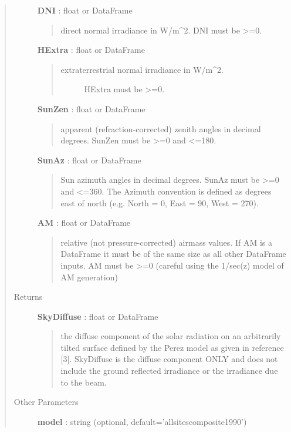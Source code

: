 \documentclass[letterpaper,10pt,english]{sphinxmanual}
\begin{document}
\begin{fulllineitems}
\begin{quote}
\begin{description}
\textbf{DNI} : float or DataFrame
\begin{quote}

direct normal irradiance in W/m\textasciicircum{}2. 
DNI must be \textgreater{}=0.
\end{quote}

\textbf{HExtra} : float or DataFrame
\begin{quote}
\begin{description}
\item[{extraterrestrial normal irradiance in W/m\textasciicircum{}2. }] \leavevmode
HExtra must be \textgreater{}=0.

\end{description}
\end{quote}

\textbf{SunZen} : float or DataFrame
\begin{quote}

apparent (refraction-corrected) zenith
angles in decimal degrees. 
SunZen must be \textgreater{}=0 and \textless{}=180.
\end{quote}

\textbf{SunAz} : float or DataFrame
\begin{quote}

Sun azimuth angles in decimal degrees.
SunAz must be \textgreater{}=0 and \textless{}=360. The Azimuth convention is defined
as degrees east of north (e.g. North = 0, East = 90, West = 270).
\end{quote}

\textbf{AM} : float or DataFrame
\begin{quote}

relative (not pressure-corrected) airmass 
values. If AM is a DataFrame it must be of the same size as all other 
DataFrame inputs. AM must be \textgreater{}=0 (careful using the 1/sec(z) model of AM
generation)
\end{quote}

\item[{Returns}] \leavevmode
\textbf{SkyDiffuse} : float or DataFrame
\begin{quote}

the diffuse component of the solar radiation  on an
arbitrarily tilted surface defined by the Perez model as given in
reference {[}3{]}.
SkyDiffuse is the diffuse component ONLY and does not include the ground
reflected irradiance or the irradiance due to the beam.
\end{quote}

\item[{Other Parameters}] \leavevmode
\textbf{model} : string (optional, default='allsitescomposite1990')
\begin{quote}


\end{quote}
\end{description}
\end{quote}
\end{fulllineitems}
\end{document}
